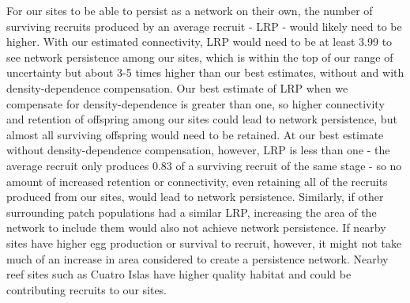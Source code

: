 \documentclass[12pt, oneside]{article}   	%
\begin{document}
For our sites to be able to persist as a network on their own, the number of surviving recruits produced by an average recruit - LRP - would likely need to be higher. With our estimated connectivity, LRP would need to be at least 3.99 to see network persistence among our sites, which is within the top of our range of uncertainty but about 3-5 times higher than our best estimates, without and with density-dependence compensation. Our best estimate of LRP when we compensate for density-dependence is greater than one, so higher connectivity and retention of offspring among our sites could lead to network persistence, but almost all surviving offspring would need to be retained. At our best estimate without density-dependence compensation, however, LRP is less than one - the average recruit only produces 0.83 of a surviving recruit of the same stage - so no amount of increased retention or connectivity, even retaining all of the recruits produced from our sites, would lead to network persistence. Similarly, if other surrounding patch populations had a similar LRP, increasing the area of the network to include them would also not achieve network persistence. If nearby sites have higher egg production or survival to recruit, however, it might not take much of an increase in area considered to create a persistence network. Nearby reef sites such as Cuatro Islas have higher quality habitat and could be contributing recruits to our sites.   
\end{document}
